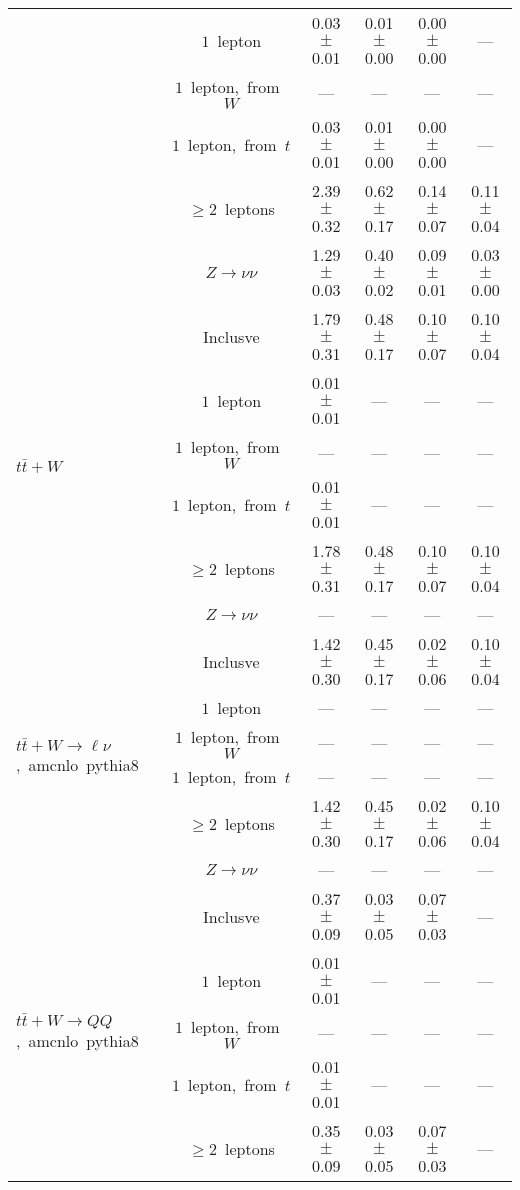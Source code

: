 \documentclass{article}
\begin{document}
\begin{longtable}{|l|c|c|c|c|c|}
 & $1$~lepton  & 0.03 $\pm$ 0.01  & 0.01 $\pm$ 0.00  & 0.00 $\pm$ 0.00  & --- \\* 
 & $1$~lepton,~from~$W$  & ---  & ---  & ---  & --- \\* 
 & $1$~lepton,~from~$t$  & 0.03 $\pm$ 0.01  & 0.01 $\pm$ 0.00  & 0.00 $\pm$ 0.00  & --- \\* 
 & $\ge2$~leptons  & 2.39 $\pm$ 0.32  & 0.62 $\pm$ 0.17  & 0.14 $\pm$ 0.07  & 0.11 $\pm$ 0.04 \\* 
 & $Z\rightarrow\nu\nu$  & 1.29 $\pm$ 0.03  & 0.40 $\pm$ 0.02  & 0.09 $\pm$ 0.01  & 0.03 $\pm$ 0.00 \\* 
\hline 
\multirow{6}{*}{$t\bar{t}+W$} & Inclusve  & 1.79 $\pm$ 0.31  & 0.48 $\pm$ 0.17  & 0.10 $\pm$ 0.07  & 0.10 $\pm$ 0.04 \\* 
 & $1$~lepton  & 0.01 $\pm$ 0.01  & ---  & ---  & --- \\* 
 & $1$~lepton,~from~$W$  & ---  & ---  & ---  & --- \\* 
 & $1$~lepton,~from~$t$  & 0.01 $\pm$ 0.01  & ---  & ---  & --- \\* 
 & $\ge2$~leptons  & 1.78 $\pm$ 0.31  & 0.48 $\pm$ 0.17  & 0.10 $\pm$ 0.07  & 0.10 $\pm$ 0.04 \\* 
 & $Z\rightarrow\nu\nu$  & ---  & ---  & ---  & --- \\* 
\hline 
\multirow{6}{*}{$t\bar{t}+W{\rightarrow}{\ell}{\nu}$,~amcnlo~pythia8} & Inclusve  & 1.42 $\pm$ 0.30  & 0.45 $\pm$ 0.17  & 0.02 $\pm$ 0.06  & 0.10 $\pm$ 0.04 \\* 
 & $1$~lepton  & ---  & ---  & ---  & --- \\* 
 & $1$~lepton,~from~$W$  & ---  & ---  & ---  & --- \\* 
 & $1$~lepton,~from~$t$  & ---  & ---  & ---  & --- \\* 
 & $\ge2$~leptons  & 1.42 $\pm$ 0.30  & 0.45 $\pm$ 0.17  & 0.02 $\pm$ 0.06  & 0.10 $\pm$ 0.04 \\* 
 & $Z\rightarrow\nu\nu$  & ---  & ---  & ---  & --- \\* 
\hline 
\multirow{6}{*}{$t\bar{t}+W{\rightarrow}QQ$,~amcnlo~pythia8} & Inclusve  & 0.37 $\pm$ 0.09  & 0.03 $\pm$ 0.05  & 0.07 $\pm$ 0.03  & --- \\* 
 & $1$~lepton  & 0.01 $\pm$ 0.01  & ---  & ---  & --- \\* 
 & $1$~lepton,~from~$W$  & ---  & ---  & ---  & --- \\* 
 & $1$~lepton,~from~$t$  & 0.01 $\pm$ 0.01  & ---  & ---  & --- \\* 
 & $\ge2$~leptons  & 0.35 $\pm$ 0.09  & 0.03 $\pm$ 0.05  & 0.07 $\pm$ 0.03  & --- \\* 

\end{longtable}
\end{document}

